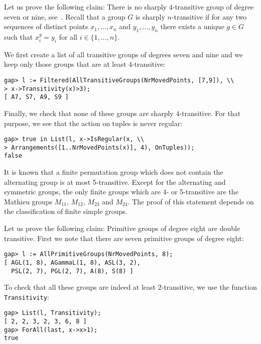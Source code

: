 \begin{example}
Let us prove the following claim: There is no sharply $4$-transitive group of
degree seven or nine, see~\cite[Exercise 1.18]{MR1721031}.
Recall that
a group $G$ is sharply $n$-transitive if for any two
sequences of distinct points $x_1,\dots,x_n$ and
$y_1,\dots,y_n$ there exists a unique $g\in G$ 
such that $x_i^g=y_i$ for all $i\in\{1,\dots,n\}$. 

We first create a
list of all transitive groups of degrees seven and nine and we keep only those
groups that are at least $4$-transitive:
\begin{lstlisting}
gap> l := Filtered(AllTransitiveGroups(NrMovedPoints, [7,9]), \\
> x->Transitivity(x)>3);                                
[ A7, S7, A9, S9 ]
\end{lstlisting}
Finally, we check that none of these groups 
are sharply $4$-transitive. For that purpose, we see that the action on tuples
is never regular:
\begin{lstlisting}
gap> true in List(l, x->IsRegular(x, \\ 
> Arrangements([1..NrMovedPoints(x)], 4), OnTuples));
false
\end{lstlisting}
It is known that a finite permutation group which does not contain the alternating group is at most 5-transitive. 
Except for the alternating and symmetric groups, the only finite groups which are 4- or 5-transitive are the Mathieu groups $M_{11}$, $M_{12}$, $M_{23}$ and $M_{24}$. 
The proof of this statement depends on the classification of finite simple groups.
\end{example}

\begin{example}
Let us prove the following claim: Primitive groups of degree eight are
double transitive. First we note that there are seven primitive groups of
degree eight:
\begin{lstlisting}
gap> l := AllPrimitiveGroups(NrMovedPoints, 8);
[ AGL(1, 8), AGammaL(1, 8), ASL(3, 2), 
  PSL(2, 7), PGL(2, 7), A(8), S(8) ]
\end{lstlisting}
To check that all these groups are indeed at least $2$-transitive, we use the
function \lstinline{Transitivity}:
\begin{lstlisting}
gap> List(l, Transitivity);
[ 2, 2, 3, 2, 3, 6, 8 ]
gap> ForAll(last, x->x>1);                 
true
\end{lstlisting}
\end{example}


